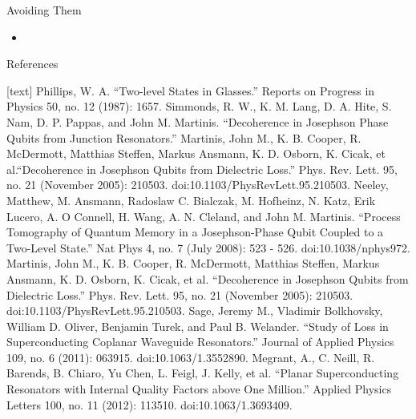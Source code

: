 \documentclass{beamer}
\begin{document}
\begin{frame}{Avoiding Them}
\begin{itemize}
{\begin{figure}[htbp]
		    \label{fig:LossTangents}
				\end{figure}}
		\item
	\end{itemize}
 \end{frame}

\begin{frame}[allowframebreaks]{References}
\begin{thebibliography}{9}
[text]
 Phillips, W. A. ``Two-level States in Glasses.'' Reports on Progress in Physics 50, no. 12 (1987): 1657.
 Simmonds, R. W., K. M. Lang, D. A. Hite, S. Nam, D. P. Pappas, and John M. Martinis. ``Decoherence in Josephson Phase Qubits from Junction Resonators.''
 Martinis, John M., K. B. Cooper, R. McDermott, Matthias Steffen, Markus Ansmann, K. D. Osborn, K. Cicak, et al.``Decoherence in Josephson Qubits from Dielectric Loss.'' Phys. Rev. Lett. 95, no. 21 (November 2005): 210503. doi:10.1103/PhysRevLett.95.210503.
 Neeley, Matthew, M. Ansmann, Radoslaw C. Bialczak, M. Hofheinz, N. Katz, Erik Lucero, A. O Connell, H. Wang, A. N. Cleland, and John M. Martinis. ``Process Tomography of Quantum Memory in a Josephson-Phase Qubit Coupled to a Two-Level State.'' Nat Phys 4, no. 7 (July 2008): 523 - 526. doi:10.1038/nphys972.
 Martinis, John M., K. B. Cooper, R. McDermott, Matthias Steffen, Markus Ansmann, K. D. Osborn, K. Cicak, et al. ``Decoherence in Josephson Qubits from Dielectric Loss.'' Phys. Rev. Lett. 95, no. 21 (November 2005): 210503. doi:10.1103/PhysRevLett.95.210503.
 Sage, Jeremy M., Vladimir Bolkhovsky, William D. Oliver, Benjamin Turek, and Paul B. Welander. ``Study of Loss in Superconducting Coplanar Waveguide Resonators.'' Journal of Applied Physics 109, no. 6 (2011): 063915. doi:10.1063/1.3552890.
 Megrant, A., C. Neill, R. Barends, B. Chiaro, Yu Chen, L. Feigl, J. Kelly, et al. ``Planar Superconducting Resonators with Internal Quality Factors above One Million.'' Applied Physics Letters 100, no. 11 (2012): 113510. doi:10.1063/1.3693409.


\end{thebibliography}

\end{frame}
\end{document}
